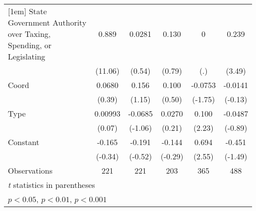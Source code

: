 {\begin{tabular*}{\linewidth}{@{\hskip\tabcolsep\extracolsep\fill}l*{5}{c}}
[1em]
State Government Authority over Taxing, Spending, or Legislating&    0.889\sym{***}&   0.0281         &    0.130         &        0         &    0.239\sym{**} \\
                &  (11.06)         &   (0.54)         &   (0.79)         &      (.)         &   (3.49)         \\
[1em]
Coord           &   0.0680         &    0.156         &    0.100         &  -0.0753         &  -0.0141         \\
                &   (0.39)         &   (1.15)         &   (0.50)         &  (-1.75)         &  (-0.13)         \\
[1em]
Type            &  0.00993         &  -0.0685         &   0.0270         &    0.100\sym{*}  &  -0.0487         \\
                &   (0.07)         &  (-1.06)         &   (0.21)         &   (2.23)         &  (-0.89)         \\
[1em]
Constant        &   -0.165         &   -0.191         &   -0.144         &    0.694\sym{*}  &   -0.451         \\
                &  (-0.34)         &  (-0.52)         &  (-0.29)         &   (2.55)         &  (-1.49)         \\
\hline
Observations    &      221         &      221         &      203         &      365         &      488         \\
\hline\hline
\multicolumn{6}{l}{\footnotesize \textit{t} statistics in parentheses}\\
\multicolumn{6}{l}{\footnotesize \sym{*} \(p<0.05\), \sym{**} \(p<0.01\), \sym{***} \(p<0.001\)}\\
\end{tabular*}
}
